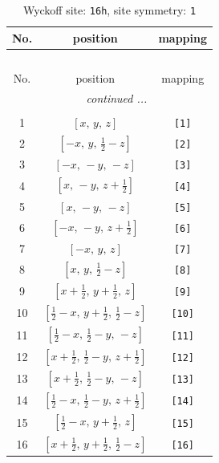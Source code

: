 \documentclass[fleqn,8pt]{jsarticle}
\begin{document}
\begin{longtable}{ccc}
\caption{Wyckoff site: {\tt 16h}, site symmetry: {\tt 1}}
 \\
 \hline \hline
No. & position & mapping \\ \hline \endfirsthead

\multicolumn{2}{l}{\tablename\ \thetable{}} \\
 \hline \hline
No. & position & mapping \\ \hline \endhead

 \hline \hline
\multicolumn{2}{r}{\footnotesize\it continued ...} \\ \endfoot

 \hline \hline
\multicolumn{2}{r}{} \\ \endlastfoot

1 & $\left[ x,\, y,\, z \right]$ & {\tt [1]} \\ \hline
2 & $\left[ - x,\, y,\, \frac{1}{2} - z \right]$ & {\tt [2]} \\ \hline
3 & $\left[ - x,\, - y,\, - z \right]$ & {\tt [3]} \\ \hline
4 & $\left[ x,\, - y,\, z + \frac{1}{2} \right]$ & {\tt [4]} \\ \hline
5 & $\left[ x,\, - y,\, - z \right]$ & {\tt [5]} \\ \hline
6 & $\left[ - x,\, - y,\, z + \frac{1}{2} \right]$ & {\tt [6]} \\ \hline
7 & $\left[ - x,\, y,\, z \right]$ & {\tt [7]} \\ \hline
8 & $\left[ x,\, y,\, \frac{1}{2} - z \right]$ & {\tt [8]} \\ \hline
9 & $\left[ x + \frac{1}{2},\, y + \frac{1}{2},\, z \right]$ & {\tt [9]} \\ \hline
10 & $\left[ \frac{1}{2} - x,\, y + \frac{1}{2},\, \frac{1}{2} - z \right]$ & {\tt [10]} \\ \hline
11 & $\left[ \frac{1}{2} - x,\, \frac{1}{2} - y,\, - z \right]$ & {\tt [11]} \\ \hline
12 & $\left[ x + \frac{1}{2},\, \frac{1}{2} - y,\, z + \frac{1}{2} \right]$ & {\tt [12]} \\ \hline
13 & $\left[ x + \frac{1}{2},\, \frac{1}{2} - y,\, - z \right]$ & {\tt [13]} \\ \hline
14 & $\left[ \frac{1}{2} - x,\, \frac{1}{2} - y,\, z + \frac{1}{2} \right]$ & {\tt [14]} \\ \hline
15 & $\left[ \frac{1}{2} - x,\, y + \frac{1}{2},\, z \right]$ & {\tt [15]} \\ \hline
16 & $\left[ x + \frac{1}{2},\, y + \frac{1}{2},\, \frac{1}{2} - z \right]$ & {\tt [16]} \\
\end{longtable}
\end{document}
